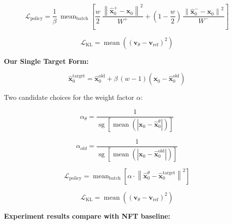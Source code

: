 \documentclass{article} %
\begin{document}
\begin{equation}
\mathcal{L}_{\mathrm{policy}} = \frac{1}{\beta}\ \operatorname{mean}_{\mathrm{batch}}\!\left[ \frac{w}{2}\,\frac{\left\|\hat{\mathbf{x}}_0^+ - \mathbf{x}_0\right\|^2}{W^{+}} + \left(1-\frac{w}{2}\right)\,\frac{\left\|\hat{\mathbf{x}}_0^- - \mathbf{x}_0\right\|^2}{W^{-}} \right]
\end{equation}

\begin{equation}
\mathcal{L}_{\mathrm{KL}} = \operatorname{mean}\!\left((\mathbf{v}_\theta - \mathbf{v}_{\mathrm{ref}})^2\right)
\end{equation}

\textbf{Our Single Target Form:}

\begin{equation}
\hat{\mathbf{x}}_0^{\mathrm{target}} = \hat{\mathbf{x}}_0^{\mathrm{old}} + \beta\,(w-1)\left(\mathbf{x}_0 - \hat{\mathbf{x}}_0^{\mathrm{old}}\right)
\end{equation}

Two candidate choices for the weight factor $\alpha$:

\begin{equation}
\alpha_{\theta} = \frac{1}{\operatorname{sg}\!\left[\operatorname{mean}\!\left(\left|\mathbf{x}_0 - \hat{\mathbf{x}}_0^\theta\right|\right)\right]}
\end{equation}

\begin{equation}
\alpha_{old} = \frac{1}{\operatorname{sg}\!\left[\operatorname{mean}\!\left(\left|\mathbf{x}_0 - \hat{\mathbf{x}}_0^{\mathrm{old}}\right|\right)\right]}
\end{equation}

\begin{equation}
\mathcal{L}_{\mathrm{policy}} = \operatorname{mean}_{\mathrm{batch}}\!\left[ \alpha \cdot \left\|\hat{\mathbf{x}}_{0}^{\theta}-\hat{\mathbf{x}}_{0}^{\mathrm{target}}\right\|^2 \right]
\end{equation}

\begin{equation}
\mathcal{L}_{\mathrm{KL}} = \operatorname{mean}\!\left((\mathbf{v}_\theta - \mathbf{v}_{\mathrm{ref}})^2\right)
\end{equation}


\textbf{Experiment results compare with NFT baseline:}
\end{document}
